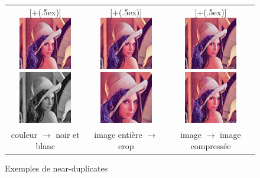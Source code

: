 \documentclass[utf8]{stageM2R} %
\newcommand*{\addheight}[2][.5ex]{%
  \raisebox{0pt}[\dimexpr\height+(#1)\relax]{#2}%
}
\begin{document}
\begin{center}
\begin{figure}
\begin{tabular}{|c|c|c|}
      \hline
      \addheight{\includegraphics[width=23mm]{images/lena_base.jpg} \includegraphics[width=23mm]{images/lena_bw.jpg}} &
      \addheight{\includegraphics[width=23mm]{images/lena_base.jpg} \includegraphics[width=23mm]{images/lena_crop.jpg}} &
      \addheight{\includegraphics[width=23mm]{images/lena_base.jpg} \includegraphics[width=23mm]{images/lena_comp.jpg}} \\
      \small couleur $\to$ noir et blanc & image entière $\to$ crop & image $\to$ image compressée\\
      \hline
\end{tabular}
\caption{Exemples de near-duplicates}
\label{fig:near-duplicates-images}
\end{figure}
\end{center}
\end{document}
